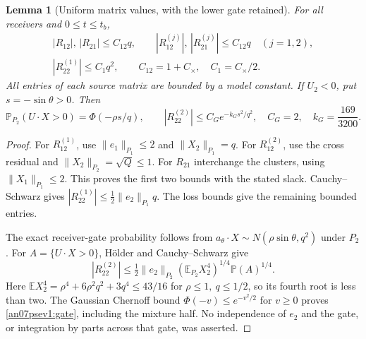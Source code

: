 \documentclass[11pt]{article}
\numberwithin{equation}{section}
\newtheorem{lemma}[theorem]{Lemma}
\theoremstyle{remark}\newtheorem{remark}[theorem]{Remark}
\newcommand{\E}{\mathbb E}\newcommand{\dd}{\,d}
\begin{document}
\begin{lemma}[Uniform matrix values, with the lower gate retained]
\label{an07psev1:matrix}
For all receivers and \(0\le t\le t_b\),
\begin{equation}
 \begin{gathered}
 |R_{12}|,\,|R_{21}|\le C_{12}q,\qquad
 |R_{12}^{(j)}|,\,|R_{21}^{(j)}|\le C_{12}q\quad(j=1,2),\\
 |R_{22}^{(1)}|\le C_1q^2,\qquad
 C_{12}=1+C_\times,\quad C_1=C_\times/2.
 \end{gathered}
 \label{an07psev1:matrixbounds}
\end{equation}
All entries of each source matrix are bounded by a model
constant. If \(U_2<0\), put \(s=-\sin\theta>0\). Then
\begin{equation}
 \mathbb P_{P_2}(U\cdot X>0)=\Phi(-\rho s/q),\qquad
 |R_{22}^{(2)}|\le C_G e^{-k_Gs^2/q^2},
 \quad C_G=2,\quad k_G=\frac{169}{3200}.
 \label{an07psev1:gate}
\end{equation}
\end{lemma}
\begin{proof}
For \(R_{12}^{(1)}\), use \(\|e_1\|_{P_1}\le2\) and
\(\|X_2\|_{P_1}=q\). For \(R_{12}^{(2)}\), use the cross
residual and \(\|X_2\|_{P_2}=\sqrt Q\le1\).
For \(R_{21}\) interchange the clusters, using
\(\|X_1\|_{P_1}\le2\). This proves the first two bounds
with the stated slack. Cauchy--Schwarz gives
\(|R_{22}^{(1)}|\le\frac12\|e_2\|_{P_1}q\).
The loss bounds give the remaining bounded entries.

The exact receiver-gate probability follows from
\(a_\theta\cdot X\sim N(\rho\sin\theta,q^2)\) under \(P_2\).
For \(A=\{U\cdot X>0\}\), Hölder and Cauchy--Schwarz give
\[
 |R_{22}^{(2)}|
 \le\tfrac12\|e_2\|_{P_2}
          (\E_{P_2}X_2^4)^{1/4}\mathbb P(A)^{1/4}.
 \]
Here \(\E X_2^4=\rho^4+6\rho^2q^2+3q^4\le43/16\)
for \(\rho\le1,\ q\le1/2\), so its fourth root is less than
two. The Gaussian Chernoff bound
\(\Phi(-v)\le e^{-v^2/2}\) for \(v\ge0\) proves
\eqref{an07psev1:gate}, including the mixture half.
No independence of \(e_2\) and the gate, or integration by
parts across that gate, was asserted.
\end{proof}
\end{document}
